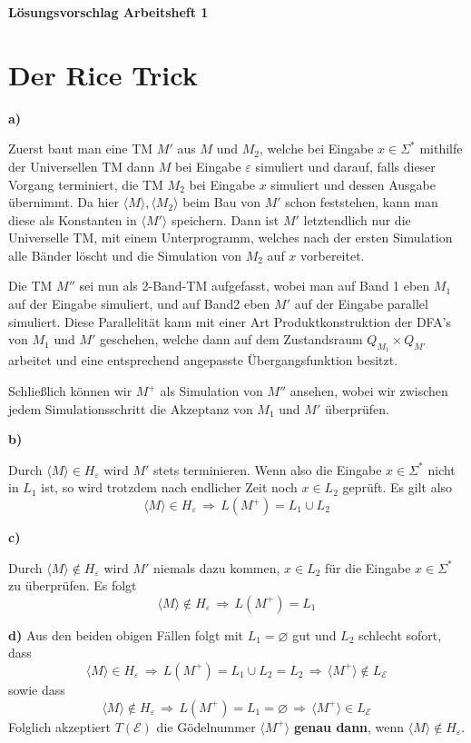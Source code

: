 \documentclass[a4paper,graphics,11pt]{article}
\newcommand{\eps}[0]{\varepsilon}
\newcommand{\godel}[1]{\langle #1 \rangle}
\begin{document}
\begin{center}
    \LARGE \textbf{Lösungsvorschlag Arbeitsheft 1}
\end{center}

\section{Der Rice Trick}

\textbf{a)}

Zuerst baut man eine TM $M'$ aus $M$ und $M_2$, welche bei Eingabe $x \in \Sigma^*$ mithilfe der
Universellen TM dann $M$ bei Eingabe $\eps$ simuliert und darauf, falls dieser Vorgang terminiert, die TM $M_2$
bei Eingabe $x$ simuliert und dessen Ausgabe übernimmt. Da hier $\godel{M}, \godel{M_2}$ beim Bau von $M'$
schon feststehen, kann man diese als Konstanten in $\godel{M'}$ speichern. Dann ist $M'$ letztendlich nur
die Universelle TM, mit einem Unterprogramm, welches nach der ersten Simulation alle Bänder löscht und
die Simulation von $M_2$ auf $x$ vorbereitet.

Die TM $M''$ sei nun als 2-Band-TM aufgefasst, wobei man auf Band 1 eben $M_1$ auf der Eingabe simuliert,
und auf Band2 eben $M'$ auf der Eingabe parallel simuliert. Diese Parallelität kann mit einer Art
Produktkonstruktion der DFA's von $M_1$ und $M'$ geschehen, welche dann auf dem Zustandsraum $Q_{M_1} \times Q_{M'}$
arbeitet und eine entsprechend angepasste Übergangsfunktion besitzt.

Schließlich können wir $M^+$ als Simulation von $M''$ ansehen, wobei wir zwischen jedem Simulationsschritt
die Akzeptanz von $M_1$ und $M'$ überprüfen.

\strut

\textbf{b)}

Durch $\godel{M} \in H_\eps$ wird $M'$ stets terminieren. Wenn also die Eingabe $x \in \Sigma^*$ nicht in $L_1$
ist, so wird trotzdem nach endlicher Zeit noch $x \in L_2$ geprüft. Es gilt also
$$
    \godel{M} \in H_\eps \,\Longrightarrow\, L(M^+) = L_1 \cup L_2
$$

\textbf{c)}

Durch $\godel{M} \notin H_\eps$ wird $M'$ niemals dazu kommen, $x \in L_2$ für die Eingabe $x \in \Sigma^*$ zu
überprüfen. Es folgt
$$
    \godel{M} \notin H_\eps \,\Longrightarrow\, L(M^+) = L_1
$$

\strut

\textbf{d)}
Aus den beiden obigen Fällen folgt mit $L_1 = \varnothing$ gut und $L_2$ schlecht sofort, dass
$$
    \godel{M} \in H_\eps \,\Longrightarrow\, L(M^+) = L_1 \cup L_2 = L_2 \,\Longrightarrow\, \godel{M^+} \notin L_\mathcal{E}
$$
sowie dass
$$
    \godel{M} \notin H_\eps \,\Longrightarrow\, L(M^+) = L_1 = \varnothing \,\Longrightarrow\, \godel{M^+} \in L_\mathcal{E}
$$
Folglich akzeptiert $T(\mathcal{E})$ die Gödelnummer $\godel{M^+}$ \textbf{genau dann}, wenn $\godel{M} \notin H_\eps$.
\end{document}
